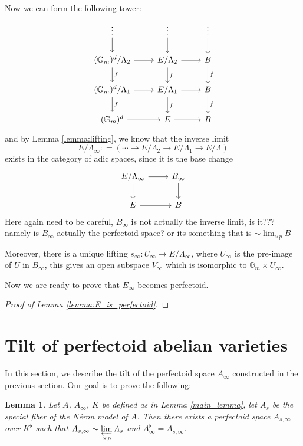 \documentclass[11pt,oneside]{amsart}
\theoremstyle{theorem}
\newtheorem{lemma}[theorem]{Lemma}
\theoremstyle{definition}
\theoremstyle{remark}
\begin{document}
Now we can form the following tower: 
\[
\begin{tikzcd}
\vdots  \arrow{d} & \vdots \arrow{d} & \vdots \arrow{d} \\
(\mathbb G_m)^d/\Lambda_2 \arrow{r}{} \arrow{d}{f} & E/\Lambda_2 \arrow{r}{}  \arrow{d}{f } & B  \arrow{d}{f} \\ 
(\mathbb G_m)^d/\Lambda_1 \arrow{r}{} \arrow{d}{f} & E/\Lambda_1 \arrow{r}{}  \arrow{d}{f } & B  \arrow{d}{f} \\ 
(\mathbb G_m)^d  \arrow{r}{} & E \arrow{r}{} & B 
\end{tikzcd}
\]
and by Lemma \ref{lemma:lifting}, we know that the inverse limit 
$$ E/\Lambda_{\infty} : = ( \cdots \rightarrow E/\Lambda_2 \rightarrow  E/\Lambda_1 \rightarrow E/\Lambda) $$ exists in the category of adic spaces, since it is the base change 
\[
\begin{tikzcd}
E/\Lambda_\infty  \arrow{r}{} \arrow{d}{} & B_\infty \arrow{d}{} \\
E \arrow{r}{} & B
\end{tikzcd}
\]
{\color{red} Here again need to be careful, $B_\infty$ is not actually the inverse limit, is it??? namely is $B_\infty$ actually the perfectoid space? or its something that is $\sim \lim_{\times p} B$ }

Moreover, there is a unique lifting $s_\infty: U_\infty \rightarrow E/\Lambda_{\infty}$, where $U_\infty$ is the pre-image of $U$ in $B_\infty$, this gives an open subspace $V_\infty$ which is isomorphic to $\mathbb G_m \times U_\infty$. 

Now we are ready to prove that $E_\infty$ becomes perfectoid. 

\begin{proof}[Proof of Lemma \ref{lemma:E_is_perfectoid}]

\end{proof} 





\newpage

\section{Tilt of perfectoid abelian varieties}

In this section, we describe the tilt of the perfectoid space $A_\infty$ constructed in the previous section. Our goal is to prove the following:

\begin{lemma} \label{lemma:A_tilt}
Let $A$, $A_\infty$, $K$ be defined as in Lemma \ref{main_lemma}, let $A_s$ be the special fiber of the N\'eron model of $A$. Then there exists a perfectoid space $A_{s,\infty}$ over $K^\flat$ such that $A_{s,\infty} \sim \displaystyle\varprojlim_{\times p} A_s$ and $A_\infty^\flat=A_{s,\infty}$.
\end{lemma} 
\end{document}
